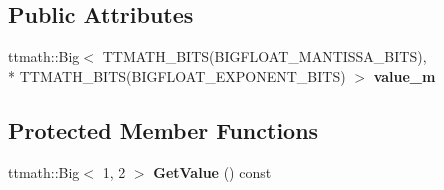 \subsection*{Public Attributes}
\begin{DoxyCompactItemize}
\item 
\hypertarget{classatl_1_1_big_float_a6ea421a4d8a71bb895f94214893b0d80}{ttmath\+::\+Big$<$ T\+T\+M\+A\+T\+H\+\_\+\+B\+I\+T\+S(B\+I\+G\+F\+L\+O\+A\+T\+\_\+\+M\+A\+N\+T\+I\+S\+S\+A\+\_\+\+B\+I\+T\+S), \\*
T\+T\+M\+A\+T\+H\+\_\+\+B\+I\+T\+S(B\+I\+G\+F\+L\+O\+A\+T\+\_\+\+E\+X\+P\+O\+N\+E\+N\+T\+\_\+\+B\+I\+T\+S) $>$ {\bfseries value\+\_\+m}}\label{classatl_1_1_big_float_a6ea421a4d8a71bb895f94214893b0d80}

\end{DoxyCompactItemize}
\subsection*{Protected Member Functions}
\begin{DoxyCompactItemize}
\item 
\hypertarget{classatl_1_1_big_float_a67404535bdd4bc31975ee2e672a7dcc3}{ttmath\+::\+Big$<$ 1, 2 $>$ {\bfseries Get\+Value} () const }\label{classatl_1_1_big_float_a67404535bdd4bc31975ee2e672a7dcc3}

\end{DoxyCompactItemize}

